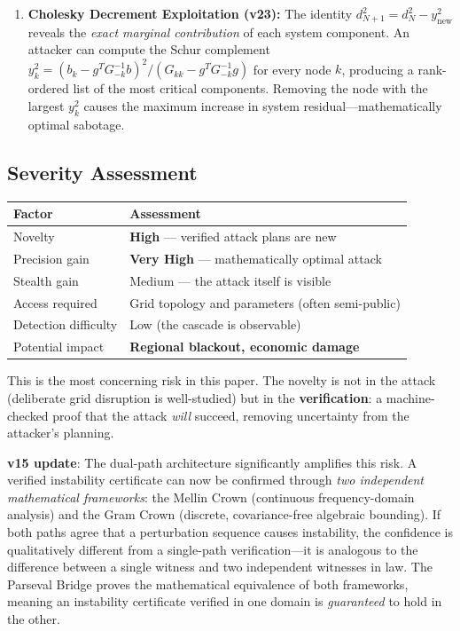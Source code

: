 \documentclass[11pt,a4paper]{article}
\begin{document}
\begin{enumerate}
  \item \textbf{Cholesky Decrement Exploitation (v23):}
    The identity $d^2_{N+1} = d^2_N - y^2_{\text{new}}$ reveals
    the \emph{exact marginal contribution} of each system component.
    An attacker can compute the Schur complement
    $y^2_k = (b_k - g^T G_{-k}^{-1} b)^2 / (G_{kk} - g^T G_{-k}^{-1} g)$
    for every node $k$, producing a rank-ordered list of the most
    critical components. Removing the node with the largest $y^2_k$
    causes the maximum increase in system residual---mathematically
    optimal sabotage.
\end{enumerate}

\subsection{Severity Assessment}

\begin{center}
\begin{tabular}{@{}ll@{}}
\toprule
\textbf{Factor} & \textbf{Assessment} \\
\midrule
Novelty & \textbf{High} --- verified attack plans are new \\
Precision gain & \textbf{Very High} --- mathematically optimal attack \\
Stealth gain & Medium --- the attack itself is visible \\
Access required & Grid topology and parameters (often semi-public) \\
Detection difficulty & Low (the cascade is observable) \\
Potential impact & \textbf{Regional blackout, economic damage} \\
\bottomrule
\end{tabular}
\end{center}

This is the most concerning risk in this paper. The novelty is not
in the attack (deliberate grid disruption is well-studied) but in
the \textbf{verification}: a machine-checked proof that the attack
\emph{will} succeed, removing uncertainty from the attacker's
planning.

\textbf{v15 update}: The dual-path architecture significantly amplifies
this risk. A verified instability certificate can now be confirmed
through \emph{two independent mathematical frameworks}: the Mellin
Crown (continuous frequency-domain analysis) and the Gram Crown
(discrete, covariance-free algebraic bounding). If both paths agree that a
perturbation sequence causes instability, the confidence is
qualitatively different from a single-path verification---it is
analogous to the difference between a single witness and two
independent witnesses in law. The Parseval Bridge proves the
mathematical equivalence of both frameworks, meaning an instability
certificate verified in one domain is \emph{guaranteed} to hold in
the other.
\end{document}
